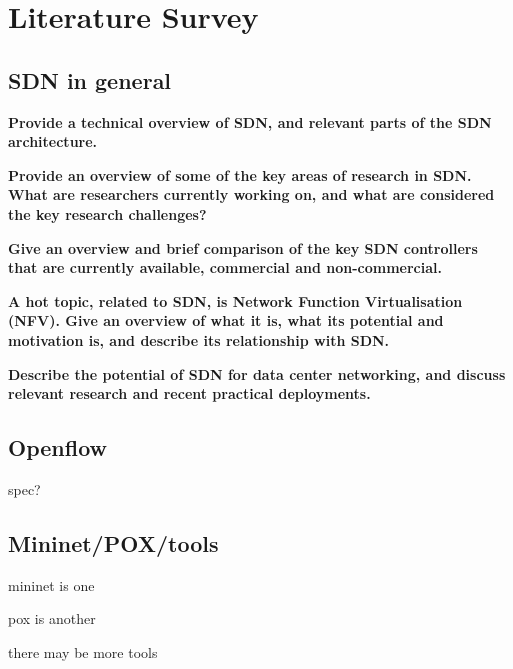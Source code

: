 \documentclass[pdftex,12pt,a4paper]{report}
\begin{document}
\chapter{Literature Survey}

\section{SDN in general}
\textbf{Provide a technical overview of SDN, and relevant parts of the SDN architecture.}

\textbf{Provide an overview of some of the key areas of research in SDN. What are researchers currently working on, and what are considered the key research challenges?}

\textbf{Give an overview and brief comparison of the key SDN controllers that are currently available, commercial and non-commercial.}

\textbf{A hot topic, related to SDN, is Network Function Virtualisation (NFV). Give an overview of what it is, what its potential and motivation is, and describe its relationship with SDN.}

\textbf{Describe the potential of SDN for data center networking, and discuss relevant research and recent practical deployments.}

\section{Openflow}
spec?

\section{Mininet/POX/tools}
mininet is one

pox is another

there may be more tools
\end{document}
